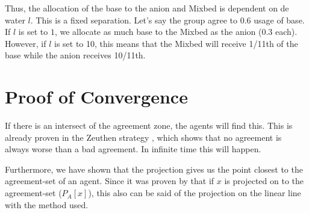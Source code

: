 Thus, the allocation of the base to the anion and Mixbed is dependent on de water $l$. This is a fixed separation. Let's say the group agree to 0.6 usage of base. If $l$ is set to $1$, we allocate as much base to the Mixbed as the anion (0.3 each). However, if $l$ is set to 10, this means that the Mixbed will receive 1/11th of the base while the anion receives 10/11th. 

\section{Proof of Convergence}
If there is an intersect of the agreement zone, the agents will find this.
This is already proven in the Zeuthen strategy \citep{rosenschein1994rules}, which shows that no agreement is always worse than a bad agreement. In infinite time this will happen. 

Furthermore, we have shown that the projection gives us the point closest to the agreement-set of an agent. Since it was proven by \citet{zheng2015automated} that if $x$ is projected on to the agreement-set  ($P_A[x]$), this also can be said of the projection on the linear line with the method used. 

%
%



